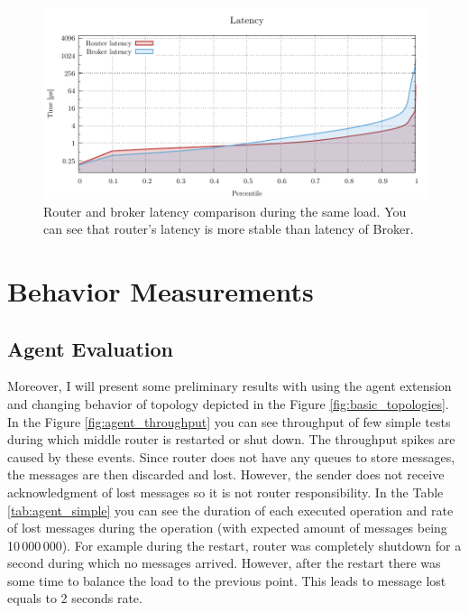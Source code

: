 \begin{figure}[h]
	\centering
	\includegraphics[width=1\linewidth]{obrazky-figures/charts-excel/latency_single.pdf}
	\caption{Router and broker latency comparison during the same load. You can see that router's latency is more stable than latency of Broker.}
	\label{fig:latency_single}
\end{figure}


\section{Behavior Measurements}
\label{Behavior Measurements}


\subsection{Agent Evaluation}
Moreover, I will present some preliminary results with using the agent extension and changing behavior of topology depicted in the Figure \ref{fig:basic_topologies}. In the Figure \ref{fig:agent_throughput} you can see throughput of few simple tests during which middle router is restarted or shut down. The throughput spikes are caused by these events. Since router does not have any queues to store messages, the messages are then discarded and lost. However, the sender does not receive acknowledgment of lost messages so it is not router responsibility. In the Table \ref{tab:agent_simple} you can see the duration of each executed operation and rate of lost messages during the operation (with expected amount of messages being 10\,000\,000). For example during the restart, router was completely shutdown for a second during which no messages arrived. However, after the restart there was some time to balance the load to the previous point. This leads to message lost equals to 2 seconds rate.

